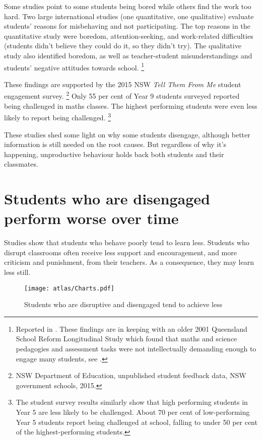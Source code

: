 \documentclass{grattan}
\begin{document}
Some studies point to some students being bored while others find the work too hard. Two large international studies (one quantitative, one qualitative) evaluate students' reasons for misbehaving and not participating. The top reasons in the quantitative study were boredom, attention-seeking, and work-related difficulties (students didn't believe they could do it, so they didn't try). The qualitative study also identified boredom, as well as teacher-student misunderstandings and students' negative attitudes towards school.%
    \footnote{Reported in \textcite{Montuoro2015StudentPerceptionsMisbehaviour}.
    These findings are in keeping with an older 2001 Queensland School Reform Longitudinal Study which found that maths and science pedagogies and assessment tasks were not intellectually demanding enough to engage many students, see \textcite{Lingard2001QueenslandSchoolReformFinalReport}.}

These findings are supported by the 2015 NSW \emph{Tell Them From Me} student engagement survey.%
    \footnote{NSW Department of Education, unpublished student feedback data, NSW government schools, 2015.}
Only 55 per cent of Year 9 students surveyed reported being challenged in maths classes. The highest performing students were even less likely to report being challenged.%
    \footnote{The student survey results similarly show that high performing students in Year 5 are less likely to be challenged. About 70 per cent of low-performing Year 5 students report being challenged at school, falling to under 50 per cent of the highest-performing students.} %

These studies shed some light on why some students disengage, although better information is still needed on the root causes. But  regardless of why it's happening, unproductive behaviour holds back both students and their classmates.

\section{Students who are disengaged perform worse over time}\label{sec:students-not-engaged-perform-worse}
Studies show that students who behave poorly tend to learn less. Students who disrupt classrooms often receive less support and encouragement, and more criticism and punishment, from their teachers. As a consequence, they may learn less still.

\begin{figure}
\caption{Students who are disruptive and disengaged tend to achieve less\label{fig:lower-scores-on-average}}%
\texttt{[image: atlas/Charts.pdf]}
%
{\textcite{Angus2009PipelineProject}}
\end{figure}
\end{document}
